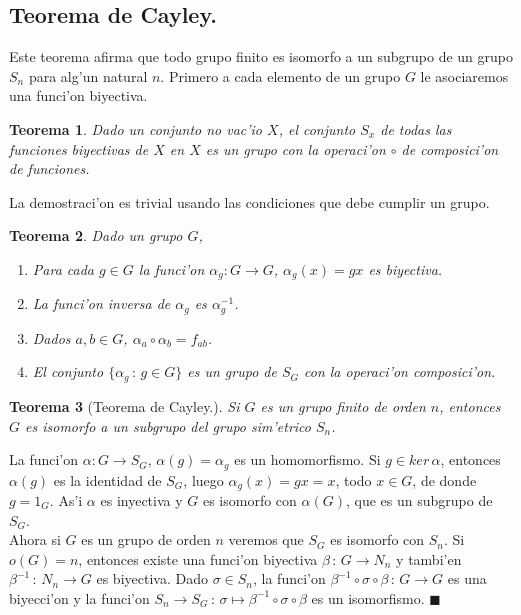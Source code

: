 \documentclass[a4paper,openright,12pt]{report}
\numberwithin{equation}{section} %
\newtheorem{teorema}{Teorema}[section] %
\newenvironment{proof}{\noindent{\it Demostracion:}}{\hfill$\blacksquare$} %
\begin{document}
\subsection{Teorema de Cayley.}
Este teorema afirma que todo grupo finito es isomorfo a un subgrupo de un grupo $S_{n}$ para alg'un natural $n$. Primero a cada elemento de un grupo $G$  le asociaremos una funci'on biyectiva.
\begin{teorema}
Dado un conjunto no vac'io $X$, el conjunto $S_{x}$ de todas las funciones biyectivas de $X$ en $X$ es un grupo con la operaci'on $\circ$ de composici'on de funciones.
\end{teorema}
La demostraci'on es trivial usando las condiciones que debe cumplir un grupo.
\begin{teorema}
Dado un grupo $G$,
\begin{enumerate}
\item Para cada $g \in G$ la funci'on $\alpha_{g}:G \rightarrow G$, $\alpha_{g}(x)=gx$ es biyectiva.
\item La funci'on inversa de $\alpha_{g}$ es $\alpha_{g}^{-1}$.
\item Dados $a,b \in G$, $\alpha_{a}\circ \alpha_{b}=f_{ab}$.
\item El conjunto $\{ \alpha_{g}\,:\,g \in G\}$ es un grupo de $S_{G}$ con la operaci'on composici'on.
\end{enumerate}
\end{teorema}
\begin{teorema}[Teorema de Cayley.]
Si $G$ es un grupo finito de orden $n$, entonces $G$ es isomorfo a un subgrupo del grupo sim'etrico $S_{n}$.
\end{teorema}
\begin{proof}
La funci'on $\alpha : G \rightarrow S_{G}$, $\alpha (g)=\alpha_{g}$ es un homomorfismo. Si $g \in ker \, \alpha$, entonces $\alpha (g)$ es la identidad de $S_{G}$, luego $\alpha_{g}(x)=gx=x$, todo $x \in G$, de donde $g=1_{G}$. As'i $\alpha$ es inyectiva y $G$ es isomorfo con $\alpha (G)$, que es un subgrupo de $S_{G}$.\\
Ahora si $G$ es un grupo de orden $n$ veremos que $S_{G}$ es isomorfo con $S_{n}$. Si $o(G)=n$, entonces existe una funci'on biyectiva $\beta \, : \, G \rightarrow N_{n}$ y tambi'en $\beta^{-1}\,:\,N_{n}\rightarrow G$ es biyectiva. Dado $\sigma \in S_{n}$, la funci'on $\beta^{-1}\circ \sigma \circ \beta \,:\, G \rightarrow G$ es una biyecci'on y la funci'on $S_{n}\rightarrow S_{G}\,:\,\sigma \mapsto \beta^{-1}\circ \sigma \circ \beta$ es un isomorfismo.
\end{proof}
\end{document}
